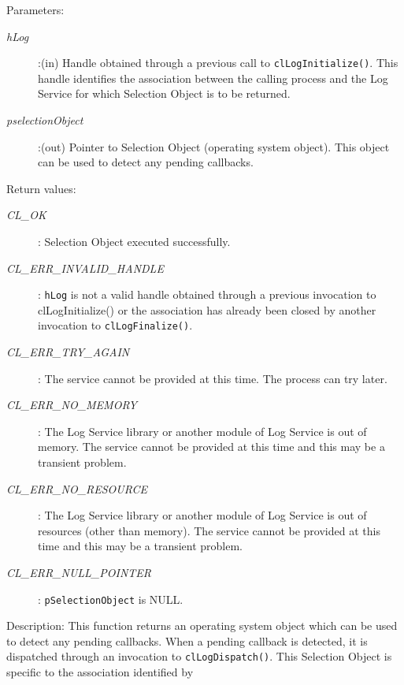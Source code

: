 \begin{flushleft}
\begin{Desc}
\begin{verbatim}
\end{verbatim}
\normalsize
\end{Desc}
\begin{Desc}
\item[Parameters:] \begin{description}
\item[{\em hLog}]:(in) Handle obtained through a previous call to {\tt{clLogInitialize()}}. This handle identifies the association between the 
calling process and the Log Service for which Selection Object is to be returned.
\item[{\em pselectionObject}]:(out) Pointer to Selection Object (operating system object). This object can be used to detect any pending callbacks.
\end{description}
\end{Desc}
\begin{Desc}
\item[Return values:]
\begin{description}
\item[{\em CL\_\-OK}]: Selection Object executed successfully.
\item[{\em CL\_\-ERR\_\-INVALID\_\-HANDLE}]: {\tt{hLog}} is not a valid handle obtained through a previous invocation to 
clLogInitialize() or the association has already been closed by another invocation to {\tt{clLogFinalize()}}.
\item[{\em CL\_\-ERR\_\-TRY\_\-AGAIN}]: The service cannot be provided at this time. The process can try later.
\item[{\em CL\_\-ERR\_\-NO\_\-MEMORY}]: The Log Service library or another module of Log Service is out of memory. The service cannot 
be provided at this time and this may be a transient problem.
\item[{\em CL\_\-ERR\_\-NO\_\-RESOURCE}]: The Log Service library or another module of Log Service is out of resources 
(other than memory). The service cannot be provided at this time and this may be a transient problem.
\item[{\em CL\_\-ERR\_\-NULL\_\-POINTER}]: {\tt{pSelectionObject}} is NULL.
\end{description}
\end{Desc}
\begin{Desc}
\item[Description:] This function returns an operating system object which can be used to detect any pending callbacks. When a pending callback is
detected, it is dispatched through an invocation to {\tt{clLogDispatch()}}. This Selection Object is specific to the association identified by 

\end{Desc}
\end{flushleft}
